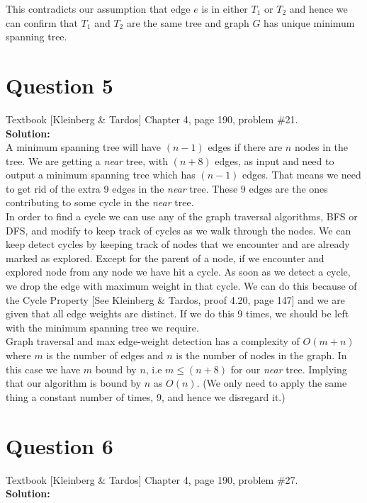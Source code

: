 \documentclass[11pt]{article}
\begin{document}
This contradicts our assumption that edge $ e $ is in either $ T_1 $ or $ T_2 $ and hence we can confirm that $ T_1 $ and $ T_2 $ are the same tree and graph $ G $ has unique minimum spanning tree.

\clearpage
\section{Question 5} Textbook [Kleinberg \& Tardos] Chapter 4, page 190, problem \#21. \\
\textbf{Solution:} \\

A minimum spanning tree will have $ (n-1) $ edges if there are $ n $ nodes in the tree. We are getting a \textit{near} tree, with $ (n+8) $ edges, as input and need to output a minimum spanning tree which has $ (n-1) $ edges. That means we need to get rid of the extra 9 edges in the \textit{near} tree. These 9 edges are the ones contributing to some cycle in the \textit{near} tree. \\

In order to find a cycle we can use any of the graph traversal algorithms, BFS or DFS, and modify to keep track of cycles as we walk through the nodes\cite{GeeksforGeeks}. We can keep detect cycles by keeping track of nodes that we encounter and are already marked as explored. Except for the parent of a node, if we encounter and explored node from any node we have hit a cycle. As soon as we detect a cycle, we drop the edge with maximum weight in that cycle. We can do this because of the Cycle Property [See Kleinberg \& Tardos, proof 4.20, page 147] and we are given that all edge weights are distinct. If we do this 9 times, we should be left with the minimum spanning tree we require. \\

Graph traversal and max edge-weight detection has a complexity of $ O(m+n) $ where $ m $ is the number of edges and $ n $ is the number of nodes in the graph. In this case we have $ m $ bound by $ n $, i.e $ m \leq (n+8) $ for our \textit{near} tree. Implying that our algorithm is bound by $ n $ as $ O(n) $. (We only need to apply the same thing a constant number of times, 9, and hence we disregard it.) \\

\clearpage
\section{Question 6} Textbook [Kleinberg \& Tardos] Chapter 4, page 190, problem \#27. \\
\textbf{Solution:} \\
\end{document}
